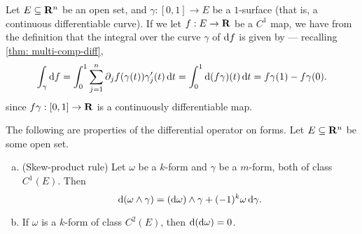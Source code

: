 \begin{example}
\label{exp:curve-integral}
Let \(E \subseteq \mathbf{R}^n\) be an open set, and \(\gamma: [0, 1] \to E\) be a
\(1\)-surface (that is, a continuous differentiable curve). If we let \(f: E \to
\mathbf{R}\) be a \(C^1\) map, we have from the definition that the integral over the
curve \(\gamma\) of \(\mathrm{d} f\) is given by --- recalling \cref{thm:
multi-comp-diff},
\[
  \int_{\gamma} \mathrm{d} f =
  \int_0^1 \sum_{j=1}^n \partial_j f (\gamma(t)) \gamma_j'(t)\, \mathrm{d} t
  = \int_0^1 \mathrm{d} (f \gamma)(t)\, \mathrm{d} t
  = f \gamma(1) - f \gamma(0).
\]
since \(f \gamma: [0, 1] \to \mathbf{R}\) is a continuously differentiable map.
\end{example}

\begin{theorem}
\label{thm:differential-operator-forms-properties}
The following are properties of the differential operator on forms. Let \(E
\subseteq \mathbf{R}^n\) be some open set.
\begin{enumerate}[(a)]\setlength\itemsep{0em}
\item (Skew-product rule) Let \(\omega\) be a \(k\)-form and \(\gamma\) be a
  \(m\)-form, both of class \(C^1(E)\). Then
  \[
    \mathrm{d} (\omega \wedge \gamma)
    = (\mathrm{d} \omega) \wedge \gamma + (-1)^k \omega\, \mathrm{d} \gamma.
  \]
\item If \(\omega\) is a \(k\)-form of class \(C^2(E)\), then \(\mathrm{d}(\mathrm{d}
  \omega) = 0\).
\end{enumerate}
\end{theorem}

